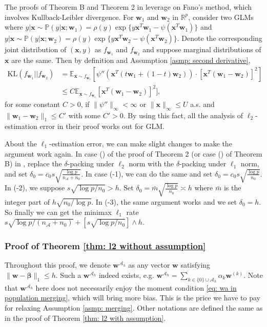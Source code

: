 \documentclass[12pt]{article}
\newcommand*{\rom}[1]{\romannumeral #1}
\newcommand{\tp}{\mathbb{P}}
\newcommand{\te}{\mathbb{E}}
\newcommand{\infnorm}[1]{\|#1\|_{\infty}}
\newcommand{\onenorm}[1]{\|#1\|_{1}}
\newcommand{\bbeta}{\bm{\beta}}
\newcommand{\bx}{\bm{x}}
\newcommand{\bw}{\bm{w}}
\newcommand{\bwk}[1]{\bm{w}^{(#1)}}
\newcommand{\bwah}{\bm{w}^{\mathcal{A}_h}}
\newcommand{\mah}{\mathcal{A}_h}
\newcommand{\na}{n_{\mathcal{A}}}
\newcommand{\transet}{\{0\}\cup \mah}
\newcommand{\<}{\langle}
\renewcommand{\>}{\rangle}
\begin{document}
The proofs of Theorem B and Theorem 2 in \cite{li2021transfer} leverage on Fano's method, which involves Kullback-Leibler divergence. For $\bw_1$ and $\bw_2$ in $\mathbb{R}^p$, consider two GLMs where $y|\bx \sim \tp(y|\bx; \bw_1) = \rho(y)\exp\{y\bx^T\bw_1 - \psi(\bx^T\bw_1)\}$ and $y|\bx \sim \tp(y|\bx; \bw_2) = \rho(y)\exp\{y\bx^T\bw_2 - \psi(\bx^T\bw_2)\}$. Denote the corresponding joint distribution of $(\bx, y)$ as $f_{\bw_1}$ and $f_{\bw_2}$ and suppose marginal distributions of $\bx$ are the same. Then by definition and Assumption \ref{asmp: second derivative},
\begin{align}
	\textrm{KL}(f_{\bw_1}||f_{\bw_2}) &= \te_{\bx \sim f_{\bw_1}}\left[\psi''(\bx^T(t\bw_1+(1-t)\bw_2))\cdot [\bx^T(\bw_1-\bw_2)]^2\right] \\
	&\leq C\te_{\bx \sim f_{\bw_1}}[\bx^T(\bw_1-\bw_2)]^2],
\end{align}
for some constant $C>0$, if $\infnorm{\psi''} < \infty$ or $\infnorm{\bx} \leq U$ a.s. and $\onenorm{\bw_1 - \bw_2} \leq C'$ with some $C' > 0$. By using this fact, all the analysis of $\ell_2$-estimation error in their proof works out for GLM.

About the $\ell_1$-estimation error, we can make slight changes to make the argument work again. In case (\rom{1}) of the proof of Theorem 2 (or case (\rom{1}) of Theorem B) in \cite{li2021transfer}, replace the $\delta$-packing under $\ell_2$ norm with the $\delta$-packing under $\ell_1$ norm, and set $\delta_0 = c_0s\sqrt{\frac{\log p}{\na+n_0}}$. In case (\rom{2}-1), we can do the same and set $\delta_0 = c_0s\sqrt{\frac{\log p}{n_0}}$. In (\rom{2}-2), we suppose $s\sqrt{\log p/n_0} > h$. Set $\delta_0 = \bar{m}\sqrt{\frac{\log p}{n_0}} \asymp h$ where $\bar{m}$ is the integer part of $h\sqrt{n_0/\log p}$. In (\rom{2}-3), the same argument works and we set $\delta_0 = h$. So finally we can get the minimax $\ell_1$ rate $s\sqrt{\log p/(\na+n_0)} + [s\sqrt{\log p/n_0}]\wedge h$.

\subsubsection{Proof of Theorem \ref{thm: l2 without assumption}}
Throughout this proof, we denote $\bwah$ as any vector $\bw$ satisfying $\onenorm{\bw - \bbeta} \leq h$. Such a $\bwah$ indeed exists, e.g. $\bwah = \sum_{k \in \transet} \alpha_k \bwk{k}$. Note that $\bwah$ here does not necessarily enjoy the moment condition \eqref{eq: wa in population merging}, which will bring more bias. This is the price we have to pay for relaxing Assumption \ref{asmp: merging}. Other notations are defined the same as in the proof of Theorem \ref{thm: l2 with assumption}.
\end{document}
